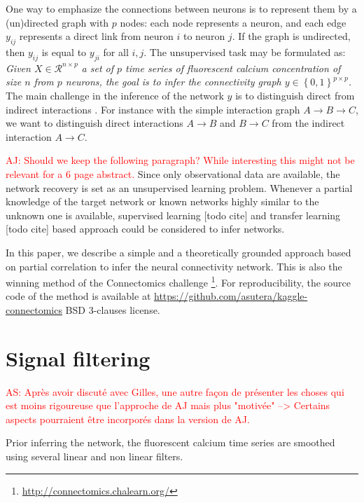 \documentclass[wcp]{jmlr}
\begin{document}
One way to emphasize the connections between neurons is to represent them by a
(un)directed graph with $p$ nodes: each node represents a neuron, and each
edge $y_{ij}$ represents a direct link from neuron  $i$ to neuron $j$. If the
graph is undirected, then $y_{ij}$ is equal to $y_{ji}$  for all $i,j$.
The unsupervised task may be formulated as:
\textit{Given $X \in \mathcal{R}^{n \times p}$  a set of $p$ time series of
fluorescent calcium concentration of size $n$ from $p$ neurons, the goal is to
infer the connectivity graph $y \in \left\{0, 1\right\}^{p \times p}$.}
The main challenge in the inference of the network $y$
is to distinguish direct from indirect interactions \cite{de2004discovery}.
For instance with the simple interaction graph $A \rightarrow B \rightarrow C$,
we want to distinguish direct interactions $A \rightarrow B$ and $B \rightarrow C$
from the indirect interaction $A \rightarrow C$.

\textcolor{red}{AJ: Should we keep the following paragraph? While interesting
                this might not be relevant for a 6 page abstract.}
Since only observational data are available, the network recovery is set as an
unsupervised learning problem. Whenever a partial knowledge of the target
network or known networks highly similar to the unknown one is available,
supervised learning [todo cite] and transfer learning  [todo cite] based
approach could be considered to infer networks.

In this paper, we describe a simple and a theoretically grounded approach
based on partial correlation to infer the neural connectivity network.
This is also the winning method of the Connectomics challenge
\footnote{\url{http://connectomics.chalearn.org/}}. For reproducibility, the
source code of the method is available at
\url{https://github.com/asutera/kaggle-connectomics}  BSD 3-clauses
license.

\section{Signal filtering} \label{sec:filter}

\textcolor{red}{AS: Après avoir discuté avec Gilles, une autre façon de
présenter les choses qui est moins rigoureuse que l'approche de AJ mais plus
"motivée" --> Certains aspects pourraient être incorporés dans la version de AJ.} 

Prior inferring the network, the fluorescent calcium time series
are smoothed using several linear and non linear filters.
\end{document}
